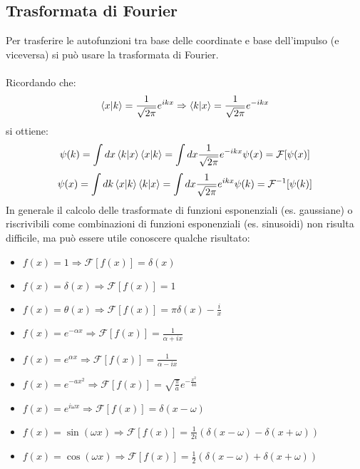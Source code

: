 \documentclass{article}
\begin{document}
\subsection{Trasformata di Fourier}
Per trasferire le autofunzioni tra base delle coordinate e base dell'impulso (e viceversa) si può usare la trasformata di Fourier.\\\\
Ricordando che:
$$ \bra{x}\ket{k}=\frac{1}{\sqrt{2\pi}}e^{ikx}\Rightarrow \bra{k}\ket{x}=\frac{1}{\sqrt{2\pi}}e^{-ikx} $$
si ottiene:
$$ \psi(k)=\int dx\bra{k}\ket{x}\bra{x}\ket{k}=\int dx \frac{1}{\sqrt{2\pi}}e^{-ikx}\psi(x)=\mathcal{F}[\psi(x)]$$
$$ \psi(x)=\int dk\bra{x}\ket{k}\bra{k}\ket{x}=\int dx \frac{1}{\sqrt{2\pi}}e^{ikx}\psi(k)=\mathcal{F}^{-1}[\psi(k)]$$
In generale il calcolo delle trasformate di funzioni esponenziali (es. gaussiane) o riscrivibili come combinazioni di funzioni esponenziali (es. sinusoidi) non risulta difficile, ma può essere utile conoscere qualche risultato:
\begin{itemize}
    \item $f(x)= 1 \Rightarrow\mathcal{F}[f(x)]= \delta(x)$
    \item $f(x)=\delta(x)\Rightarrow\mathcal{F}[f(x)]=1$
    \item $f(x)= \theta(x) \Rightarrow\mathcal{F}[f(x)]= \pi\delta(x)-\frac{i}{x}$
    \item $f(x)= e^{-\alpha x} \Rightarrow\mathcal{F}[f(x)]= \frac{1}{\alpha+ix}$
    \item $f(x)= e^{\alpha x} \Rightarrow\mathcal{F}[f(x)]= \frac{1}{\alpha-ix}$
    \item $f(x)= e^{-ax^2} \Rightarrow\mathcal{F}[f(x)]= \sqrt{\frac{\pi}{a}}e^{-\frac{x^2}{4a}}$
    \item $f(x)= e^{i\omega x} \Rightarrow\mathcal{F}[f(x)]= \delta(x-\omega)$
    \item $f(x)= \sin(\omega x) \Rightarrow\mathcal{F}[f(x)]= \frac{1}{2i}(\delta(x-\omega)-\delta(x+\omega))$
    \item $f(x)= \cos(\omega x) \Rightarrow\mathcal{F}[f(x)]= \frac{1}{2}(\delta(x-\omega)+\delta(x+\omega))$
    
\end{itemize}
\end{document}
